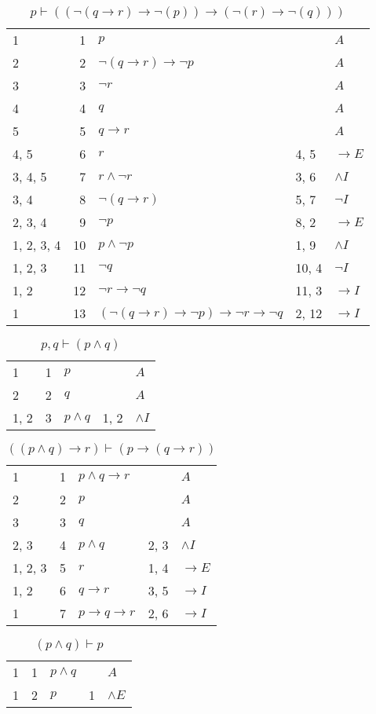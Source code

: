 \documentclass{article}
\begin{document}
\begin{table}[htbp]\caption*{$p ⊢ ((¬(q→r)→ ¬(p))→ (¬(r)→ ¬(q)))$}\centering\begin{tabular}{lrlll}
{1} & 1 & $p$ & {} & $A$ \\
{2} & 2 & $¬ (q→r)→ ¬p$ & {} & $A$ \\
{3} & 3 & $¬r$ & {} & $A$ \\
{4} & 4 & $q$ & {} & $A$ \\
{5} & 5 & $q→r$ & {} & $A$ \\
{4, 5} & 6 & $r$ & {4, 5} & $→E$ \\
{3, 4, 5} & 7 & $r∧ ¬r$ & {3, 6} & $∧I$ \\
{3, 4} & 8 & $¬ (q→r)$ & {5, 7} & $¬I$ \\
{2, 3, 4} & 9 & $¬p$ & {8, 2} & $→E$ \\
{1, 2, 3, 4} & 10 & $p∧ ¬p$ & {1, 9} & $∧I$ \\
{1, 2, 3} & 11 & $¬q$ & {10, 4} & $¬I$ \\
{1, 2} & 12 & $¬r→ ¬q$ & {11, 3} & $→I$ \\
{1} & 13 & $(¬ (q→r)→ ¬p)→ ¬r→ ¬q$ & {2, 12} & $→I$ \\
\end{tabular}
\end{table}
\begin{table}[htbp]\caption*{$p,q ⊢ (p ∧ q)$}\centering\begin{tabular}{lrlll}
{1} & 1 & $p$ & {} & $A$ \\
{2} & 2 & $q$ & {} & $A$ \\
{1, 2} & 3 & $p∧q$ & {1, 2} & $∧I$ \\
\end{tabular}
\end{table}
\begin{table}[htbp]\caption*{$((p ∧ q) → r) ⊢ (p → (q → r))$}\centering\begin{tabular}{lrlll}
{1} & 1 & $p∧q→r$ & {} & $A$ \\
{2} & 2 & $p$ & {} & $A$ \\
{3} & 3 & $q$ & {} & $A$ \\
{2, 3} & 4 & $p∧q$ & {2, 3} & $∧I$ \\
{1, 2, 3} & 5 & $r$ & {1, 4} & $→E$ \\
{1, 2} & 6 & $q→r$ & {3, 5} & $→I$ \\
{1} & 7 & $p→q→r$ & {2, 6} & $→I$ \\
\end{tabular}
\end{table}
\begin{table}[htbp]\caption*{$(p ∧ q) ⊢ p$}\centering\begin{tabular}{lrlll}
{1} & 1 & $p∧q$ & {} & $A$ \\
{1} & 2 & $p$ & {1} & $∧E$ \\
\end{tabular}
\end{table}
\end{document}

